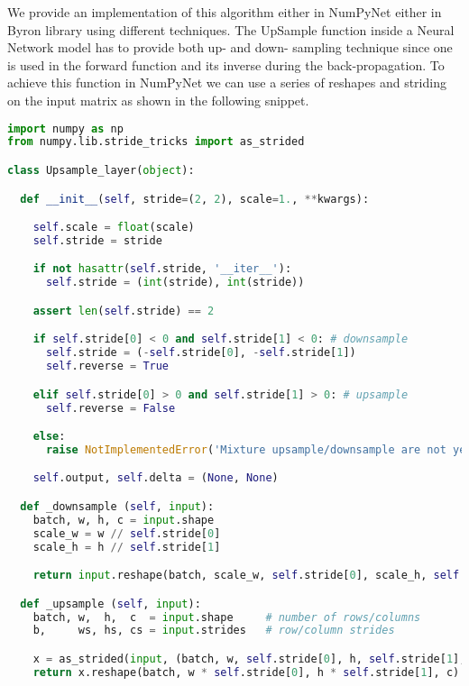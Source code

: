 \documentclass{standalone}
\begin{document}
We provide an implementation of this algorithm either in \textsf{NumPyNet} either in \textsf{Byron} library using different techniques.
The UpSample function inside a Neural Network model has to provide both up- and down- sampling technique since one is used in the forward function and its inverse during the back-propagation.
To achieve this function in \textsf{NumPyNet} we can use a series of reshapes and striding on the input matrix as shown in the following snippet.

\lstset{style=snippet}
\begin{lstlisting}[language=Python, caption=NumPyNet version of Upsampling function, label=code:py_upsample]
import numpy as np
from numpy.lib.stride_tricks import as_strided

class Upsample_layer(object):

  def __init__(self, stride=(2, 2), scale=1., **kwargs):

    self.scale = float(scale)
    self.stride = stride

    if not hasattr(self.stride, '__iter__'):
      self.stride = (int(stride), int(stride))

    assert len(self.stride) == 2

    if self.stride[0] < 0 and self.stride[1] < 0: # downsample
      self.stride = (-self.stride[0], -self.stride[1])
      self.reverse = True

    elif self.stride[0] > 0 and self.stride[1] > 0: # upsample
      self.reverse = False

    else:
      raise NotImplementedError('Mixture upsample/downsample are not yet implemented')

    self.output, self.delta = (None, None)

  def _downsample (self, input):
    batch, w, h, c = input.shape
    scale_w = w // self.stride[0]
    scale_h = h // self.stride[1]

    return input.reshape(batch, scale_w, self.stride[0], scale_h, self.stride[1], c).mean(axis=(2, 4))

  def _upsample (self, input):
    batch, w,  h,  c  = input.shape     # number of rows/columns
    b,     ws, hs, cs = input.strides   # row/column strides

    x = as_strided(input, (batch, w, self.stride[0], h, self.stride[1], c), (b, ws, 0, hs, 0, cs)) # view a as larger 4D array
    return x.reshape(batch, w * self.stride[0], h * self.stride[1], c)                                     # create new 2D array


\end{lstlisting}
\end{document}

